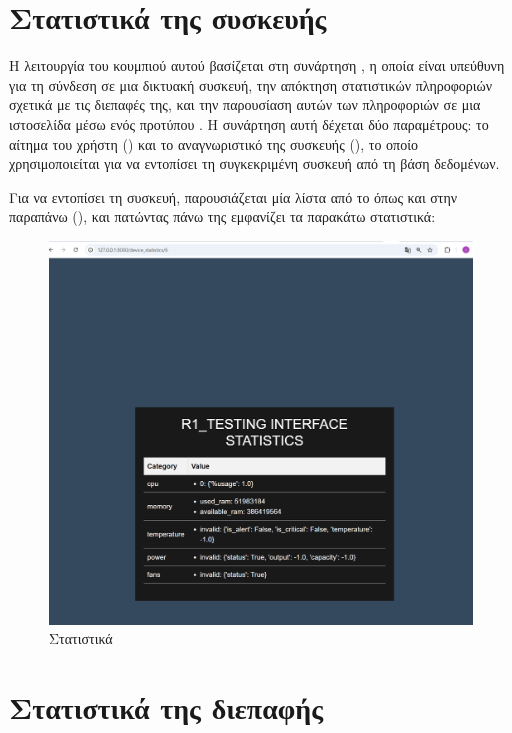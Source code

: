 \section{Στατιστικά της συσκευής}

Η λειτουργία του κουμπιού αυτού βασίζεται στη συνάρτηση , 
η οποία είναι υπεύθυνη για τη σύνδεση σε μια δικτυακή συσκευή, 
την απόκτηση στατιστικών πληροφοριών σχετικά με τις 
διεπαφές της, και την παρουσίαση αυτών των πληροφοριών 
σε μια ιστοσελίδα μέσω ενός προτύπου . Η συνάρτηση αυτή 
δέχεται δύο παραμέτρους: το αίτημα του χρήστη () 
και το αναγνωριστικό της συσκευής (), 
το οποίο χρησιμοποιείται για να εντοπίσει τη συγκεκριμένη 
συσκευή από τη βάση δεδομένων.

Για να εντοπίσει τη συσκευή, παρουσιάζεται μία λίστα από το 
 όπως και στην παραπάνω (), 
και πατώντας πάνω της εμφανίζει τα παρακάτω στατιστικά:

\FloatBarrier

\begin{figure}[h]
	\centering
	\includegraphics[width=1.0\textwidth]{graphics/statistics.png}
	\caption{Στατιστικά}
\end{figure}

\section{Στατιστικά της διεπαφής}

